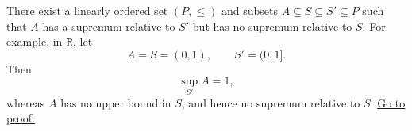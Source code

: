 \begin{theorem}
\label{thm:ambient-existence-supremum}
There exist a linearly ordered set $(P,\leq)$ and subsets
$A\subseteq S\subseteq S'\subseteq P$ such that $A$ has a supremum relative to
$S'$ but has no supremum relative to $S$.  For example, in $\mathbb{R}$, let
\[
  A=S=(0,1),
  \qquad
  S'=(0,1].
\]
Then
\[
  \sup_{S'}A=1,
\]
whereas $A$ has no upper bound in $S$, and hence no supremum relative to $S$.
\hyperref[prf:ambient-existence-supremum]{Go to proof.}
\end{theorem}